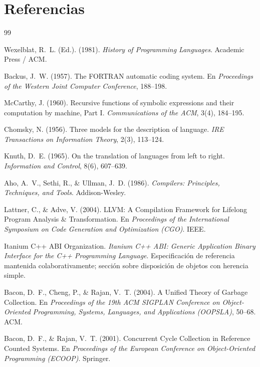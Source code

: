 \documentclass[12pt, a4paper]{article}
\begin{document}

\section{Referencias}

\begin{thebibliography}{99}

Wexelblat, R.~L. (Ed.). (1981). \textit{History of Programming Languages}.
Academic Press / ACM.

Backus, J.~W. (1957). The FORTRAN automatic coding system. En
\textit{Proceedings of the Western Joint Computer Conference}, 188--198.

McCarthy, J. (1960). Recursive functions of symbolic expressions and their
computation by machine, Part I. \textit{Communications of the ACM}, 3(4),
184--195.

Chomsky, N. (1956). Three models for the description of language.
\textit{IRE Transactions on Information Theory}, 2(3), 113--124.

Knuth, D.~E. (1965). On the translation of languages from left to right.
\textit{Information and Control}, 8(6), 607--639.

Aho, A.~V., Sethi, R., \& Ullman, J.~D. (1986). \textit{Compilers:
Principles, Techniques, and Tools}. Addison-Wesley.

Lattner, C., \& Adve, V. (2004). LLVM: A Compilation Framework for Lifelong
Program Analysis \& Transformation. En \textit{Proceedings of the
International Symposium on Code Generation and Optimization (CGO)}. IEEE.

Itanium C++ ABI Organization. \textit{Itanium C++ ABI: Generic Application
Binary Interface for the C++ Programming Language}. Especificación de
referencia mantenida colaborativamente; sección sobre disposición de objetos
con herencia simple.

Bacon, D.~F., Cheng, P., \& Rajan, V.~T. (2004). A Unified Theory of Garbage
Collection. En \textit{Proceedings of the 19th ACM SIGPLAN Conference on
Object-Oriented Programming, Systems, Languages, and Applications (OOPSLA)},
50--68. ACM.

Bacon, D.~F., \& Rajan, V.~T. (2001). Concurrent Cycle Collection in
Reference Counted Systems. En \textit{Proceedings of the European Conference
on Object-Oriented Programming (ECOOP)}. Springer.


\end{thebibliography}
\end{document}
